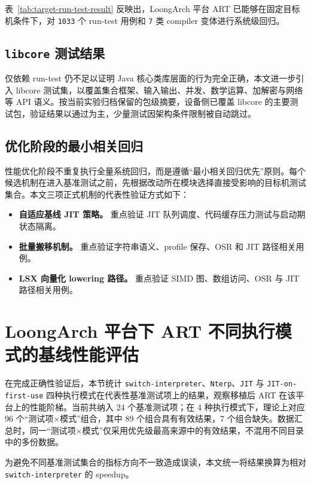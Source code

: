 表~\ref{tab:target-run-test-result} 反映出，LoongArch 平台 ART 已能够在固定目标机条件下，对 \texttt{1033} 个 run-test 用例和 \texttt{7} 类 compiler 变体进行系统级回归。

\subsection{\texorpdfstring{\texttt{libcore} 测试结果}{libcore 测试结果}}

仅依赖 run-test 仍不足以证明 Java 核心类库层面的行为完全正确，本文进一步引入 libcore 测试集，以覆盖集合框架、输入输出、并发、数学运算、加解密与网络等 API 语义。按当前实验归档保留的包级摘要，设备侧已覆盖 libcore 的主要测试包，验证结果以通过为主，少量测试因架构条件限制被自动跳过。

\subsection{优化阶段的最小相关回归}

性能优化阶段不重复执行全量系统回归，而是遵循“最小相关回归优先”原则。每个候选机制在进入基准测试之前，先根据改动所在模块选择直接受影响的目标机测试集合。本文三项正式机制的代表性验证方式如下：
\begin{itemize}
    \item \textbf{自适应基线 JIT 策略。} 重点验证 JIT 队列调度、代码缓存压力测试与启动期状态隔离。
    \item \textbf{批量搬移机制。} 重点验证字符串语义、profile 保存、OSR 和 JIT 路径相关用例。
    \item \textbf{LSX 向量化 lowering 路径。} 重点验证 SIMD 图、数组访问、OSR 与 JIT 路径相关用例。
\end{itemize}

\section{LoongArch 平台下 ART 不同执行模式的基线性能评估}
\label{sec:art-mode-baseline}

在完成正确性验证后，本节统计 \texttt{switch-interpreter}、\texttt{Nterp}、\texttt{JIT} 与 \texttt{JIT-on-first-use} 四种执行模式在代表性基准测试项上的结果，观察移植后 ART 在该平台上的性能阶梯。当前共纳入 24 个基准测试项；在 4 种执行模式下，理论上对应 96 个“测试项$\times$模式”组合，其中 89 个组合具有有效结果，7 个组合缺失。数据汇总时，同一“测试项$\times$模式”仅采用优先级最高来源中的有效结果，不混用不同目录中的多份数据。

为避免不同基准测试集合的指标方向不一致造成误读，本文统一将结果换算为相对 \texttt{switch-interpreter} 的 speedup。

